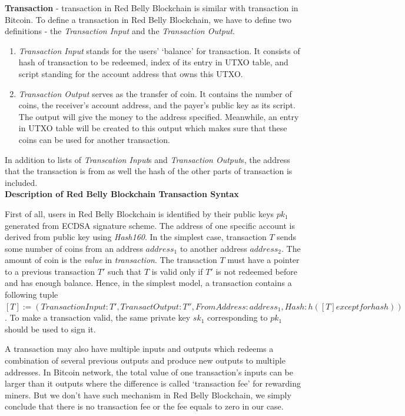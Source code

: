 \documentclass[12pt]{article}
\begin{document}
\textbf{Transaction} - transaction in Red Belly Blockchain is similar with transaction in Bitcoin. To define a transaction in Red Belly Blockchain, we have to define two definitions - the \textit{Transaction Input} and the \textit{Transaction Output}.

\begin{enumerate}
       \item \textit{Transaction Input} stands for the users' `balance' for transaction. It consists of hash of transaction to be redeemed, index of its entry in UTXO table, and script standing for the account address that owns this UTXO.
       \item \textit{Transaction Output} serves as the transfer of coin. It contains the number of coins, the receiver's account address, and the payer's public key as its script. The output will give the money to the address specified. Meanwhile, an entry in UTXO table will be created to this output which makes sure that these coins can be used for another transaction.
\end{enumerate}

In addition to lists of \textit{Transcation Input}s and \textit{Transaction Output}s, the address that the transaction is from as well the hash of the other parts of transaction is included.\\

\textbf{Description of Red Belly Blockchain Transaction Syntax}

First of all, users in Red Belly Blockchain is identified by their public keys ${pk_1}$ generated from ECDSA signature scheme. The address of one specific account is derived from public key using \textit{Hash160}. In the simplest case, transaction $T$ sends some number of coins from an address ${address_1}$ to another address ${address_2}$. The amount of coin is the \textit{value} in \textit{transaction}. The transaction $T$ must have a pointer to a previous transaction $T'$ such that $T$ is valid only if $T'$ is not redeemed before and has enough balance. Hence, in the simplest model, a transaction contains a following tuple $[T] := (TransactionInput: T', TransactOutput: T'', FromAddress: {address_1}, Hash: h([T] except for hash))$. To make a transaction valid, the same private key ${sk_1}$ corresponding to ${pk_1}$ should be used to sign it.

A transaction may also have multiple inputs and outputs which redeems a combination of several previous outputs and produce new outputs to multiple addresses. In Bitcoin network, the total value of one transaction's inputs can be larger than it outputs where the difference is called `transaction fee' for rewarding miners. But we don't have such mechanism in Red Belly Blockchain, we simply conclude that there is no transaction fee or the fee equals to zero in our case.
\end{document}
